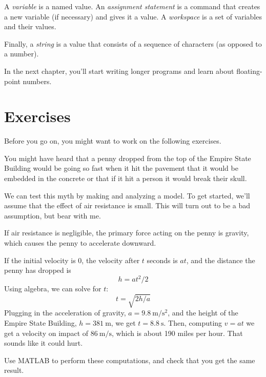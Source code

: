 A \emph{variable} is a named value. An \emph{assignment statement} is a command that creates a new variable (if necessary) and gives it a value.
A \emph{workspace} is a set of variables and their values.

Finally, a \emph{string} is a value that consists of a sequence of characters (as opposed to a number).

In the next chapter, you'll start writing longer programs and learn about floating-point numbers.

\section{Exercises}

Before you go on, you might want to work on the following exercises.

\begin{ex}
\label{penny}
You might have heard that a penny dropped from the top of the Empire State Building would be going so fast when it hit the pavement that it would be embedded in the concrete or that if it hit a person it would break their skull.


We can test this myth by making and analyzing a model.  To get started, we'll assume that the effect of air resistance is small.  This will turn out to be a bad assumption, but bear with me.

If air resistance is negligible, the primary force acting on the penny is gravity, which causes the penny to accelerate downward.


If the initial velocity is 0, the velocity after $t$ seconds is $a t$, and the distance the penny has dropped is
%
\[ h = a t^2 / 2 \]
%
Using algebra, we can solve for $t$:
%
\[ t = \sqrt{ 2 h / a} \]
%
Plugging in the acceleration of gravity,
$a = \SI{9.8}{\meter\per\second\squared}$, and the height of the Empire State Building,
$h = \SI{381}{\meter}$, we get
$t = \SI{8.8}{\second}$.
Then, computing $v = a t$ we get a velocity on impact of $\SI{86}{\meter\per\second}$, which is about 190 miles per hour.  That sounds like it could hurt.

Use MATLAB to perform these computations, and check that you get the same result.
\end{ex}

